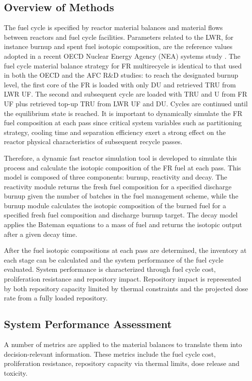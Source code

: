 \subsection{Overview of Methods}
\label{ses_sec:method_overview}
The fuel cycle is specified by reactor material balances and material
flows between reactors and fuel cycle facilities.  Parameters related to
the LWR, for instance burnup and spent fuel isotopic composition, are
the reference values adopted in a recent OECD Nuclear Energy Agency (NEA)
systems study \cite{NEA-5990}.  The fuel cycle material balance strategy for FR
multirecycle is identical to that used in both the OECD and the AFC R\&D
studies: to reach the designated burnup level, the first core of the FR
is loaded with only DU and retrieved TRU from LWR UF. The second and
subsequent cycle are loaded with TRU and U from FR UF plus retrieved
top-up TRU from LWR UF and DU.  Cycles are continued
until the equilibrium state is reached.  It is important to dynamically
simulate the FR fuel composition at each pass since critical system
variables such as partitioning strategy, cooling time and separation
efficiency exert a strong effect on the reactor physical characteristics
of subsequent recycle passes. 

Therefore, a dynamic fast reactor simulation tool is developed to
simulate this process and calculate the isotopic composition of the FR
fuel at each pass.  This model is composed of three components: burnup,
reactivity and decay.  The reactivity module returns the fresh fuel
composition for a specified discharge burnup given the number of batches
in the fuel management scheme, while the burnup module calculates the
isotopic composition of the burned fuel for a specified fresh fuel
composition and discharge burnup target.  The decay model applies the
Bateman equations to a mass of fuel and returns the isotopic output
after a given decay time.  

After the fuel isotopic compositions at each pass are determined, the
inventory at each stage can be calculated and the system performance of
the fuel cycle evaluated.  System performance is characterized through
fuel cycle cost, proliferation resistance and repository impact. 
Repository impact is represented by both repository capacity limited by
thermal constraints and the projected dose rate from a fully loaded
repository.  



\subsection{System Performance Assessment}
\label{ses_sec:spa}
A number of metrics are applied to the material balances to translate
them into decision-relevant information.  These metrics include the fuel
cycle cost, proliferation resistance, repository capacity via thermal
limits, dose release and toxicity.

